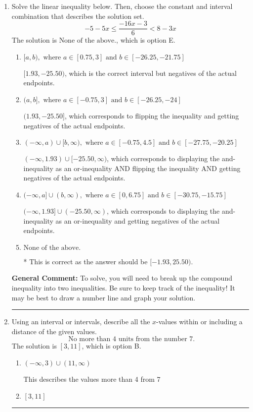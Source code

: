 \documentclass{extbook}[14pt]
\newcommand{\litem}[1]{\item #1

\rule{\textwidth}{0.4pt}}
\begin{document}
\begin{enumerate}\litem{
Solve the linear inequality below. Then, choose the constant and interval combination that describes the solution set.
\[ -5 - 5 x \leq \frac{-16 x - 3}{6} < 8 - 3 x \]The solution is \( \text{None of the above.} \), which is option E.\begin{enumerate}[label=\Alph*.]
\item \( [a, b), \text{ where } a \in [0.75, 3] \text{ and } b \in [-26.25, -21.75] \)

$[1.93, -25.50)$, which is the correct interval but negatives of the actual endpoints.
\item \( (a, b], \text{ where } a \in [-0.75, 3] \text{ and } b \in [-26.25, -24] \)

$(1.93, -25.50]$, which corresponds to flipping the inequality and getting negatives of the actual endpoints.
\item \( (-\infty, a) \cup [b, \infty), \text{ where } a \in [-0.75, 4.5] \text{ and } b \in [-27.75, -20.25] \)

$(-\infty, 1.93) \cup [-25.50, \infty)$, which corresponds to displaying the and-inequality as an or-inequality AND flipping the inequality AND getting negatives of the actual endpoints.
\item \( (-\infty, a] \cup (b, \infty), \text{ where } a \in [0, 6.75] \text{ and } b \in [-30.75, -15.75] \)

$(-\infty, 1.93] \cup (-25.50, \infty)$, which corresponds to displaying the and-inequality as an or-inequality and getting negatives of the actual endpoints.
\item \( \text{None of the above.} \)

* This is correct as the answer should be $[-1.93, 25.50)$.
\end{enumerate}

\textbf{General Comment:} To solve, you will need to break up the compound inequality into two inequalities. Be sure to keep track of the inequality! It may be best to draw a number line and graph your solution.
}
\litem{
Using an interval or intervals, describe all the $x$-values within or including a distance of the given values.
\[ \text{ No more than } 4 \text{ units from the number } 7. \]The solution is \( [3, 11] \), which is option B.\begin{enumerate}[label=\Alph*.]
\item \( (-\infty, 3) \cup (11, \infty) \)

This describes the values more than 4 from 7
\item \( [3, 11] \)


\end{enumerate}}
\end{enumerate}
\end{document}
